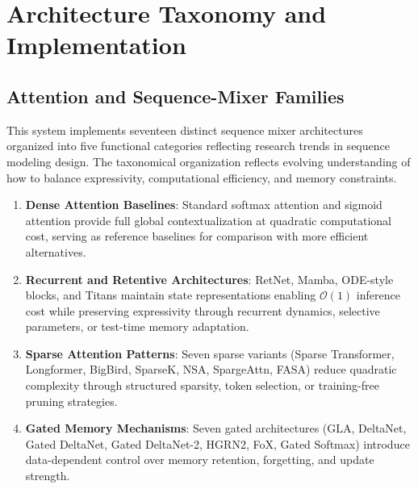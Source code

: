 \section{Architecture Taxonomy and Implementation}
\label{sec:architecture-taxonomy}

\subsection{Attention and Sequence-Mixer Families}
\label{sec:attention-families}

This system implements seventeen distinct sequence mixer architectures organized into five functional categories reflecting research trends in sequence modeling design. The taxonomical organization reflects evolving understanding of how to balance expressivity, computational efficiency, and memory constraints.

\begin{enumerate}[leftmargin=*]
    \item \textbf{Dense Attention Baselines}: Standard softmax attention and sigmoid attention provide full global contextualization at quadratic computational cost, serving as reference baselines for comparison with more efficient alternatives.
    \item \textbf{Recurrent and Retentive Architectures}: RetNet, Mamba, ODE-style blocks, and Titans maintain state representations enabling $\mathcal{O}(1)$ inference cost while preserving expressivity through recurrent dynamics, selective parameters, or test-time memory adaptation.
    \item \textbf{Sparse Attention Patterns}: Seven sparse variants (Sparse Transformer, Longformer, BigBird, SparseK, NSA, SpargeAttn, FASA) reduce quadratic complexity through structured sparsity, token selection, or training-free pruning strategies.
    \item \textbf{Gated Memory Mechanisms}: Seven gated architectures (GLA, DeltaNet, Gated DeltaNet, Gated DeltaNet-2, HGRN2, FoX, Gated Softmax) introduce data-dependent control over memory retention, forgetting, and update strength.
\end{enumerate}

